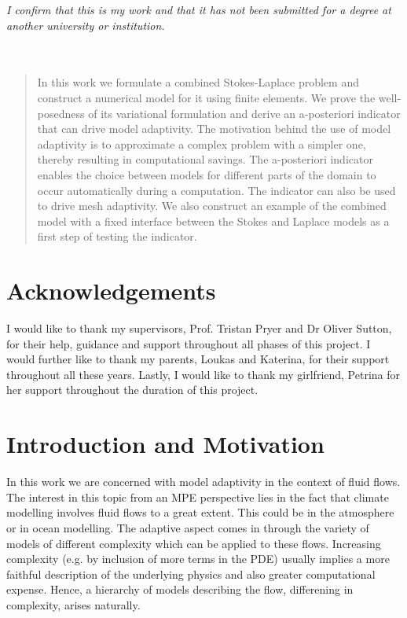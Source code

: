 \documentclass[12pt,a4paper]{article}
\theoremstyle{definition}
\begin{document}
\pagebreak
\thispagestyle{empty}
\emph{I confirm that this is my work and that it has not been submitted for a degree at another university or institution.\\}
\emph{\\}
\emph{\\}
	\vspace{1\baselineskip} 
\pagebreak
\pagebreak
\thispagestyle{empty}
\begin{abstract}
In this work we formulate a combined Stokes-Laplace problem and construct a numerical model for it using finite elements.  We prove the well-posedness of its variational formulation and derive an a-posteriori indicator that can drive model adaptivity.  The motivation behind the use of model adaptivity is to approximate a complex problem with a simpler one, thereby resulting in computational savings.  The a-posteriori indicator enables the choice between models for different parts of the domain to occur automatically during a computation.  The indicator can also be used to drive mesh adaptivity.  We also construct an example of the combined model with a fixed interface between the Stokes and Laplace models as a first step of testing the indicator.
\end{abstract}
\thispagestyle{empty}
\pagebreak
\pagebreak
\thispagestyle{empty}
\section*{Acknowledgements}
I would like to thank my supervisors, Prof. Tristan Pryer and Dr Oliver Sutton, for their help, guidance and support throughout all phases of this project.  I would further like to thank my parents, Loukas and Katerina, for their support throughout all these years.  Lastly, I would like to thank my girlfriend, Petrina for her support throughout the duration of this project.

\thispagestyle{empty}
\pagebreak
{}

\thispagestyle{empty}
\newpage
\tableofcontents
\thispagestyle{empty}
\newpage
\setcounter{page}{1}


\section{Introduction and Motivation}

In this work we are concerned with model adaptivity in the context of fluid flows.  The interest in this topic from an MPE perspective lies in the fact that climate modelling involves fluid flows to a great extent.  This could be in the atmosphere or in ocean modelling.  The adaptive aspect comes in through the variety of models of different complexity which can be applied to these flows.  Increasing complexity (e.g. by inclusion of more terms in the PDE) usually implies a more faithful description of the underlying physics and also greater computational expense. Hence, a hierarchy of models describing the flow, differening in complexity, arises naturally.
\end{document}
